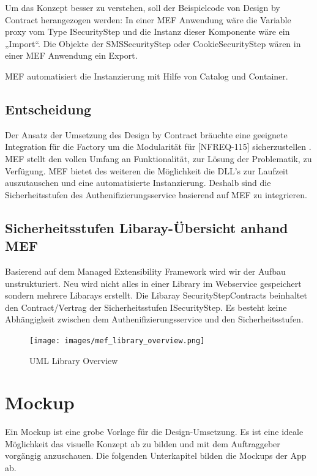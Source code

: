 Um das Konzept besser zu verstehen, soll der Beispielcode von Design by
Contract herangezogen werden: In einer MEF Anwendung wäre die Variable
proxy vom Type ISecurityStep und die Instanz dieser Komponente wäre ein
„Import``. Die Objekte der SMSSecurityStep oder CookieSecurityStep wären
in einer MEF Anwendung ein Export.

MEF automatisiert die Instanzierung mit Hilfe von Catalog und Container.

\subsection{Entscheidung}\label{entscheidung-1}

Der Ansatz der Umsetzung des Design by Contract bräuchte eine geeignete
Integration für die Factory um die Modularität für {[}NFREQ-115{]}
sicherzustellen . MEF stellt den vollen Umfang an Funktionalität, zur
Lösung der Problematik, zu Verfügung. MEF bietet des weiteren die
Möglichkeit die DLL's zur Laufzeit auszutauschen und eine automatisierte
Instanzierung. Deshalb sind die Sicherheitsstufen des
Authenifizierungsservice basierend auf MEF zu integrieren.

\newpage

\subsection{Sicherheitsstufen Libaray-Übersicht anhand
MEF}\label{sicherheitsstufen-libaray-uxfcbersicht-anhand-mef}

Basierend auf dem Managed Extensibility Framework wird wir der Aufbau
unstrukturiert. Neu wird nicht alles in einer Library im Webservice
gespeichert sondern mehrere Libarays erstellt. Die Libaray
SecurityStepContracts beinhaltet den Contract/Vertrag der
Sicherheitsstufen ISecurityStep. Es besteht keine Abhängigkeit zwischen
dem Authenifizierungsservice und den Sicherheitsstufen.

\begin{figure}[htbp]
\centering
\texttt{[image: images/mef\_library\_overview.png]}
\caption{UML Library Overview}
\end{figure}

\newpage

\hypertarget{mockup}{\section{Mockup}\label{mockup}}

Ein Mockup ist eine grobe Vorlage für die Design-Umsetzung. Es ist eine
ideale Möglichkeit das visuelle Konzept ab zu bilden und mit dem
Auftraggeber vorgängig anzuschauen. Die folgenden Unterkapitel bilden
die Mockups der App ab.

